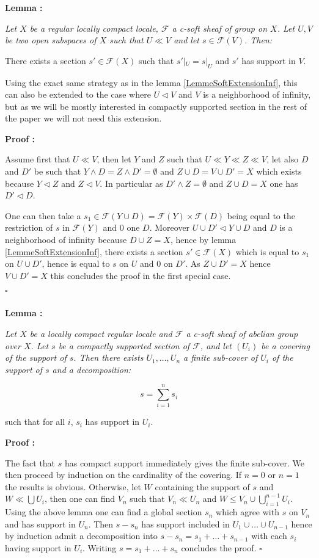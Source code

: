 \documentclass[a4paper]{article}
\newcommand{\Fcal}{\mathcal{F}}
\newcommand{\block}[1]
{

\par \subsubsection{} #1

\bigskip}
\newcommand{\Lem}[1]
	{

	\bigskip
	
	\textbf{Lemma : }{\itshape #1}
		
	\bigskip
	
	}
\newcommand{\Dem}[1]{
	
	\smallskip
	
	\textbf{Proof : } \par
	 {#1} $\square$
	 
	 \bigskip
}
\begin{document}
\block{\label{Lem_cptSup_extension}\Lem{Let $X$ be a regular locally compact locale, $\Fcal$ a c-soft sheaf of group on $X$. Let $U,V$ be two open subspaces of $X$ such that $U \ll V$ and let $s \in \Fcal(V)$. Then:

There exists a section $s' \in \Fcal(X)$ such that $s'|_U = s|_U$ and $s'$ has support in $V$. }

Using the exact same strategy as in the lemma \ref{LemmeSoftExtensionInf}, this can also be extended to the case where $U \triangleleft V$ and $V$ is a neighborhood of infinity, but as we will be mostly interested in compactly supported section in the rest of the paper we will not need this extension.

\Dem{Assume first that $U \ll V$, then let $Y$ and $Z$ such that $U \ll Y \ll Z \ll V$, let also $D$ and $D'$ be such that $Y \wedge D = Z \wedge D'=\emptyset$ and $Z \cup D = V \cup D'=X$ which exists because $Y \triangleleft Z$ and $Z \triangleleft V$. In particular as $D' \wedge Z= \emptyset$ and $Z \cup D = X$ one has $D' \triangleleft D$.

One can then take a $s_1 \in \Fcal( Y \cup D ) = \Fcal(Y) \times \Fcal(D)$ being equal to the restriction of $s$ in $\Fcal(Y)$ and $0$ one $D$. Moreover $U \cup  D' \triangleleft Y \cup D$ and $D$ is a neighborhood of infinity because $D \cup Z =X$, hence by lemma \ref{LemmeSoftExtensionInf}, there exists a section $s' \in \Fcal(X)$ which is equal to $s_1$ on $U \cup D'$, hence is equal to $s$ on $U$ and $0$ on $D'$. As $Z \cup D' =X$ hence $V \cup D' =X$ this concludes the proof in the first special case.
}
}



\block{\label{Lem_partition}\Lem{Let $X$ be a locally compact regular locale and $\Fcal$ a c-soft sheaf of abelian group over $X$. Let $s$ be a compactly supported section of $\Fcal$, and let $(U_i)$ be a covering of the support of $s$.
Then there exists $U_1,\dots, U_n$ a finite sub-cover of $U_i$ of the support of $s$ and a decomposition: 


\[ s = \sum_{i=1}^n s_i \]

such that for all $i$, $s_i$ has support in $U_i$.

}

\Dem{The fact that $s$ has compact support immediately gives the finite sub-cover. We then proceed by induction on the cardinality of the covering. If $n=0$ or $n=1$ the results is obvious. Otherwise, let $W$ containing the support of $s$ and $W \ll \bigcup U_i$, then one can find $V_n$ such that $V_n \ll U_n$ and $W \leqslant V_n \cup \bigcup_{i=1}^{n-1} U_i$. Using the above lemma one can find a global section $s_n$ which agree with $s$ on $V_n$ and has support in $U_n$. Then $s-s_n$ has support included in $U_1 \cup \dots \cup U_{n-1}$ hence by induction admit a decomposition into $s-s_n=s_1 + \dots + s_{n-1}$ with each $s_i$ having support in $U_i$. Writing $s=s_1+ \dots +s_n$ concludes the proof.
}
}
\end{document}
